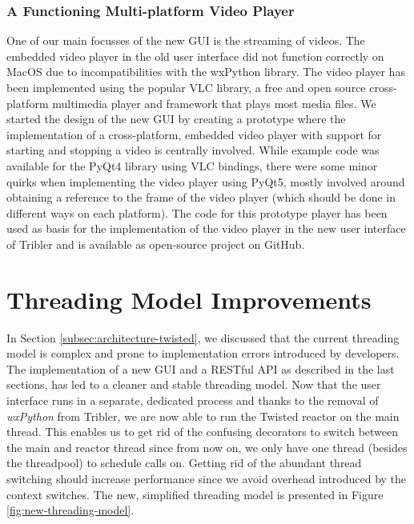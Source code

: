 \subsubsection{\textbf{A Functioning Multi-platform Video Player}}
One of our main focusses of the new GUI is the streaming of videos. The embedded video player in the old user interface did not function correctly on MacOS due to incompatibilities with the wxPython library. The video player has been implemented using the popular VLC library\cite{vlcwebsite}, a free and open source cross-platform multimedia player and framework that plays most media files. We started the design of the new GUI by creating a prototype where the implementation of a cross-platform, embedded video player with support for starting and stopping a video is centrally involved. While example code was available for the PyQt4 library using VLC bindings, there were some minor quirks when implementing the video player using PyQt5, mostly involved around obtaining a reference to the frame of the video player (which should be done in different ways on each platform). The code for this prototype player has been used as basis for the implementation of the video player in the new user interface of Tribler and is available as open-source project on GitHub\cite{vos2016vlc}.

\section{Threading Model Improvements}
In Section \ref{subsec:architecture-twisted}, we discussed that the current threading model is complex and prone to implementation errors introduced by developers. The implementation of a new GUI and a RESTful API as described in the last sections, has led to a cleaner and stable threading model. Now that the user interface runs in a separate, dedicated process and thanks to the removal of \emph{wxPython} from Tribler, we are now able to run the Twisted reactor on the main thread. This enables us to get rid of the confusing decorators to switch between the main and reactor thread since from now on, we only have one thread (besides the threadpool) to schedule calls on. Getting rid of the abundant thread switching should increase performance since we avoid overhead introduced by the context switches. The new, simplified threading model is presented in Figure \ref{fig:new-threading-model}.

